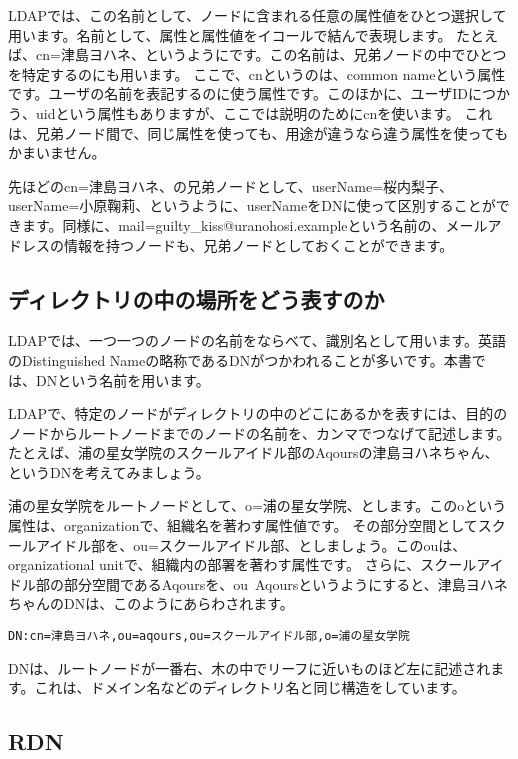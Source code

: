 LDAPでは、この名前として、ノードに含まれる任意の属性値をひとつ選択して用います。名前として、属性と属性値をイコールで結んで表現します。
たとえば、cn=津島ヨハネ、というようにです。この名前は、兄弟ノードの中でひとつを特定するのにも用います。
ここで、cnというのは、common nameという属性です。ユーザの名前を表記するのに使う属性です。このほかに、ユーザIDにつかう、uidという属性もありますが、ここでは説明のためにcnを使います。
これは、兄弟ノード間で、同じ属性を使っても、用途が違うなら違う属性を使ってもかまいません。

先ほどのcn=津島ヨハネ、の兄弟ノードとして、userName=桜内梨子、userName=小原鞠莉、というように、userNameをDNに使って区別することができます。同様に、mail=guilty\_kiss@uranohosi.exampleという名前の、メールアドレスの情報を持つノードも、兄弟ノードとしておくことができます。

\subsection{ディレクトリの中の場所をどう表すのか}

LDAPでは、一つ一つのノードの名前をならべて、識別名として用います。英語のDistinguished Nameの略称であるDNがつかわれることが多いです。本書では、DNという名前を用います。

LDAPで、特定のノードがディレクトリの中のどこにあるかを表すには、目的のノードからルートノードまでのノードの名前を、カンマでつなげて記述します。たとえば、浦の星女学院のスクールアイドル部のAqoursの津島ヨハネちゃん、というDNを考えてみましょう。

浦の星女学院をルートノードとして、o=浦の星女学院、とします。このoという属性は、organizationで、組織名を著わす属性値です。
その部分空間としてスクールアイドル部を、ou=スクールアイドル部、としましょう。このouは、organizational unitで、組織内の部署を著わす属性です。
さらに、スクールアイドル部の部分空間であるAqoursを、ou~Aqoursというようにすると、津島ヨハネちゃんのDNは、このようにあらわされます。

\begin{verbatim}
DN:cn=津島ヨハネ,ou=aqours,ou=スクールアイドル部,o=浦の星女学院
\end{verbatim}

DNは、ルートノードが一番右、木の中でリーフに近いものほど左に記述されます。これは、ドメイン名などのディレクトリ名と同じ構造をしています。

\subsection{RDN}

